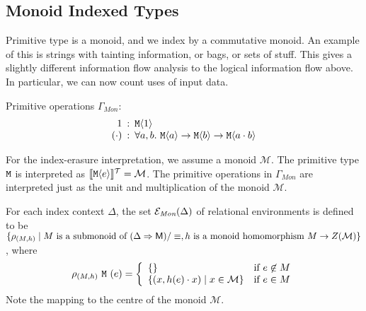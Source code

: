 \subsection{Monoid Indexed Types}
\label{sec:monoid-indexed-types}

\newcommand{\Mon}{\textit{Mon}}

Primitive type is a monoid, and we index by a commutative monoid. An
example of this is strings with tainting information, or bags, or sets
of stuff. This gives a slightly different information flow analysis to
the logical information flow above. In particular, we can now count
uses of input data.

Primitive operations $\Gamma_{\mathit{Mon}}$:
\begin{displaymath}
  \begin{array}{r@{\hspace{0.5em}:\hspace{0.5em}}l}
    1 & \tyPrim{M}{1} \\
    (\cdot) & \forall a,b.\ \tyPrim{M}{a} \to \tyPrim{M}{b} \to \tyPrim{M}{a\cdot b}
  \end{array}
\end{displaymath}

For the index-erasure interpretation, we assume a monoid
$\mathcal{M}$. The primitive type $\texttt{M}$ is interpreted as
$\llbracket \textup{\texttt{M}}\langle e \rangle \rrbracket^{\mathcal{T}} = \mathcal{M}$. The primitive operations in
$\Gamma_{\mathit{Mon}}$ are interpreted just as the unit and
multiplication of the monoid $\mathcal{M}$.


For each index context $\Delta$, the set
$\relEnv{E}_\Mon(\Delta)$ of relational environments is
defined to be $\{ \rho_{(M,h)} \mathrel| M\textrm{ is a submonoid of
}(\Delta \Rightarrow \mathsf{M})/\equiv, h\textrm{ is a monoid
  homomorphism }M \to Z(\mathcal{M}) \}$, where
\begin{displaymath}
  \rho_{(M,h)}\ \texttt{M}\ (e) = \left\{
    \begin{array}{ll}
      \{ \} & \textrm{if}\ e\not\in M \\
      \{ (x, h(e)\cdot x) \mathrel| x \in \mathcal{M} \} & \textrm{if}\ e\in M
    \end{array}
  \right.
\end{displaymath}
Note the mapping to the centre of the monoid
$\mathcal{M}$. 


